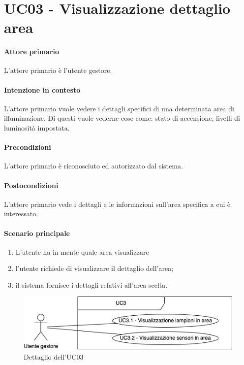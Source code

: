 \section{UC03 - Visualizzazione dettaglio area}\label{uc:03}

\paragraph{Attore primario} L'attore primario è l'utente gestore.
\paragraph{Intenzione in contesto} L'attore primario vuole vedere i dettagli specifici di una determinata area di illuminazione. Di questi vuole vederne cose come: stato di accensione, livelli di luminosità impostata.

\paragraph{Precondizioni} L'attore primario è riconosciuto ed autorizzato dal sistema.

\paragraph{Postocondizioni} L'attore primario vede i dettagli e le informazioni sull'area specifica a cui è interessato.

\paragraph{Scenario principale}

\begin{enumerate}
    \item L'utente ha in mente quale area visualizzare
    \item l'utente richiede di visualizzare il dettaglio dell'area;
    \item il sistema fornisce i dettagli relativi all'area scelta.
\end{enumerate}

\begin{figure}[h]
    \includegraphics[width=\textwidth]{contenuti/img/casi_uso_grafici-uc3.png}
    \caption{Dettaglio dell'UC03}
    \label{fig:uc03}
\end{figure}

